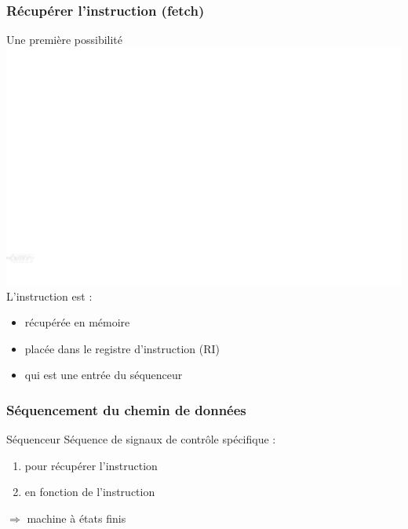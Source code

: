 \documentclass{beamer}
\begin{document}
\begin{frame}
\frametitle{Récupérer l'instruction (fetch)}
\begin{block}{Une première possibilité}
\includegraphics[width=\linewidth]{Figs/premier_chemin_ri.pdf}\\
L'instruction est :
\begin{itemize}
\item récupérée en mémoire
\item placée dans le registre d'instruction (RI)
\item qui est une entrée du séquenceur
\end{itemize}
\end{block}
\end{frame}

\begin{frame}
\frametitle{Séquencement du chemin de données}
\begin{block}{Séquenceur}
Séquence de signaux de contrôle spécifique :
\begin{enumerate}
\item pour récupérer l'instruction 
\item en fonction de l'instruction
\end{enumerate}
$\Rightarrow$ machine à états finis
\end{block}
\end{frame}
\end{document}
